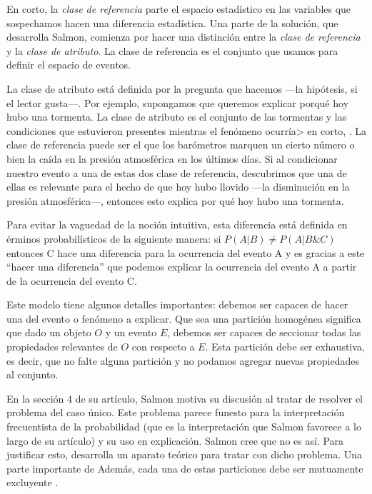En corto, la \emph{clase de referencia} parte el espacio estadístico en las
variables que sospechamos hacen una diferencia estadística. Una parte de la
solución, que desarrolla Salmon, comienza por hacer
una distinción entre la \emph{clase de referencia} y la \emph{clase de
	atributo}. La clase de referencia es el conjunto que usamos para
definir el espacio de eventos.

La clase de atributo está definida por la pregunta que hacemos ---la hipótesis,
si el lector gusta---. Por ejemplo, supongamos que queremos explicar porqué hoy
hubo una tormenta. La clase de atributo es el conjunto de las tormentas y las
condiciones que estuvieron presentes mientras el fenómeno ocurría> en
corto, . La clase de referencia puede ser el que los barómetros
marquen un cierto número o bien la caída en la presión atmosférica en
los últimos días. Si al condicionar nuestro evento a una de estas dos
clase de referencia, descubrimos que una de ellas es relevante para
el hecho de que hoy hubo llovido ---la disminución en la presión
atmosférica---, entonces esto explica por qué hoy hubo una tormenta.

Para evitar la vaguedad de la noción intuitiva, esta  diferencia está definida
en érminos probabilísticos de la siguiente manera: si $P(A|B) \neq P(A|B\&C)$
entonces C hace una diferencia para la ocurrencia del evento A y es gracias a
este ``hacer una diferencia'' que podemos explicar la ocurrencia del evento A a
partir de la ocurrencia del evento C.

Este modelo tiene algunos detalles importantes: debemos ser capaces de hacer una
 del evento o fenómeno a explicar. Que sea una partición
homogénea significa que dado un objeto $O$ y un evento $E$, debemos ser capaces de
seccionar todas las propiedades relevantes de $O$ con respecto a $E$. Esta partición
debe ser exhaustiva, es decir, que no falte alguna partición y no podamos agregar nuevas
propiedades al conjunto.


En la sección 4 de su artículo, Salmon motiva su discusión al tratar de resolver el problema del caso único. Este problema parece funesto para la interpretación frecuentista de la probabilidad (que es la interpretación que Salmon favorece a lo largo de su artículo) y su uso en explicación. Salmon cree que no es así. Para justificar esto, desarrolla un aparato teórico para tratar con dicho problema. Una parte importante de  Además, cada una de estas particiones debe ser mutuamente excluyente \cite{Woodward2019}.

